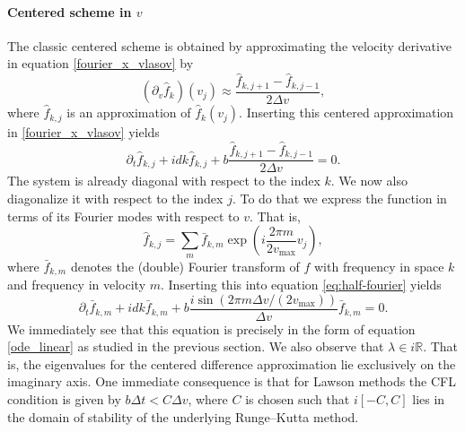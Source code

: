 \paragraph{Centered scheme in $v$\\}
The classic centered scheme is obtained by approximating the velocity derivative in equation \eqref{fourier_x_vlasov} by
$$
  (\partial_v \hat{f}_{k})(v_j) \approx \frac{\hat{f}_{k, j+1}-\hat{f}_{k, j-1}}{2\Delta v},
$$ 
where $\hat{f}_{k,j}$ is an approximation of $\hat{f}_{k}(v_j)$.  Inserting this centered approximation 
in \eqref{fourier_x_vlasov} yields
\begin{equation} \label{eq:half-fourier}
  \partial_t \hat{f}_{k,j} +  i d k\hat{f}_{k,j} +b \frac{\hat{f}_{k,j+1} -\hat{f}_{k,j-1} }{2\Delta v} = 0.
\end{equation}
The system is already diagonal with respect to the index $k$. We now also diagonalize it with respect to the index $j$. To do that we express the function in terms of its Fourier modes with respect to $v$. That is,
\[
  \hat{f}_{k,j} = \sum_m \bar{f}_{k, m}\exp\left(i \frac{2\pi m}{2v_{\max}}  v_j\right),
\]
where $\bar{f}_{k,m}$ denotes the (double) Fourier transform of $f$ with frequency in space $k$ and frequency in velocity $m$. Inserting this into equation \eqref{eq:half-fourier} yields
\begin{equation}
  \label{discrete_linear_transport}
	\partial_t \bar{f}_{k,m} + i dk\bar{f}_{k,m} +b \frac{i\sin(2\pi m \Delta v/(2v_{\max})) }{\Delta v} \bar{f}_{k,m}= 0.  
\end{equation}
We immediately see that this equation is precisely in the form of equation \eqref{ode_linear} as studied in the previous section. We also observe that $\lambda \in i\mathbb{R}$. That is, the eigenvalues for the centered difference approximation lie exclusively on the imaginary axis. One immediate consequence is that for Lawson methods the CFL condition is given by $b \Delta t < C \Delta v$, where $C$ is chosen such that $i [-C,C]$ lies in the domain of stability of the underlying Runge--Kutta method.



